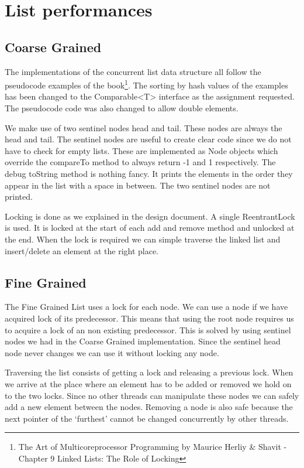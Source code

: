 \documentclass[10pt,a4paper]{article}
\begin{document}
\section{List performances}
\subsection{Coarse Grained}
The implementations of the concurrent list data structure all follow the pseudocode examples of the book\footnote{The Art of Multicoreprocessor Programming by Maurice Herliy \& Shavit - Chapter 9 Linked Lists: The Role of Locking}. The sorting by hash values of the examples has been changed to the Comparable<T> interface as the assignment requested. The pseudocode code was also changed to allow double elements.

We make use of two sentinel nodes head and tail. These nodes are always the head and tail. The sentinel nodes are useful to create clear code since we do not have to check for empty lists. These are implemented as Node objects which override the compareTo method to always return -1 and 1 respectively. The debug toString method is nothing fancy. It prints the elements in the order they appear in the list with a space in between. The two sentinel nodes are not printed.

Locking is done as we explained in the design document. A single ReentrantLock is used. It is locked at the start of each add and remove method and unlocked at the end. When the lock is required we can simple traverse the linked list and insert/delete an element at the right place. 

\subsection{Fine Grained}
The Fine Grained List uses a lock for each node. We can use a node if we have acquired lock of its predecessor. This means that using the root node requires us to acquire a lock of an non existing predecessor. This is solved by using sentinel nodes we had in the Coarse Grained implementation. Since the sentinel head node never changes we can use it without locking any node.

Traversing the list consists of getting a lock and releasing a previous lock. When we arrive at the place where an element has to be added or removed we hold on to the two locks. Since no other threads can manipulate these nodes we can safely add a new element between the nodes. Removing a node is also safe because the next pointer of the `furthest' cannot be changed concurrently by other threads.
\end{document}
